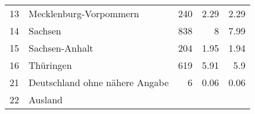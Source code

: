 \begin{longtable}{lXrrr}
     13 &
     \multicolumn{1}{X}{ Mecklenburg-Vorpommern   } &


       \num{240} &
       \num[round-mode=places,round-precision=2]{2,29} &
         \num[round-mode=places,round-precision=2]{2,29} \\

     14 &
     \multicolumn{1}{X}{ Sachsen   } &


       \num{838} &
       \num[round-mode=places,round-precision=2]{8} &
         \num[round-mode=places,round-precision=2]{7,99} \\

     15 &
     \multicolumn{1}{X}{ Sachsen-Anhalt   } &


       \num{204} &
       \num[round-mode=places,round-precision=2]{1,95} &
         \num[round-mode=places,round-precision=2]{1,94} \\

     16 &
     \multicolumn{1}{X}{ Thüringen   } &


       \num{619} &
       \num[round-mode=places,round-precision=2]{5,91} &
         \num[round-mode=places,round-precision=2]{5,9} \\

     21 &
     \multicolumn{1}{X}{ Deutschland ohne nähere Angabe   } &


       \num{6} &
       \num[round-mode=places,round-precision=2]{0,06} &
         \num[round-mode=places,round-precision=2]{0,06} \\

     22 &
     \multicolumn{1}{X}{ Ausland   } &



\end{longtable}
